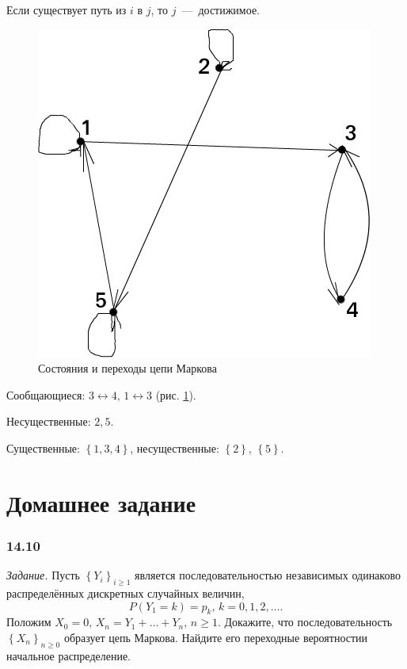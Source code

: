 Если существует путь из $i$ в $j$, то $j$~---~достижимое.

\begin{figure}[h!]
  \centering
  \includegraphics[width=.4\textwidth]{./pictures/14_6.png}
  \caption{Состояния и переходы цепи Маркова}
  \label{fig:146}
\end{figure}

Сообщающиеся: $3 \leftrightarrow 4, \, 1 \leftrightarrow 3$ (рис. \ref{fig:146}).

Несущественные: $2, 5$.

Существенные: $ \left\{ 1, 3, 4 \right\} $, несущественные:
$ \left\{ 2 \right\}, \, \left\{ 5 \right\} $.

\section*{Домашнее задание}

\subsubsection*{14.10}

\textit{Задание.}
Пусть $ \left\{ Y_i \right\}_{i \geq 1}$
является последовательностью независимых одинаково распределённых дискретных случайных величин,
\begin{equation*}
  P \left( Y_1 = k \right) = p_k, \,
  k = 0, 1, 2, \dotsc.
\end{equation*}
Положим $X_0 = 0, \, X_n = Y_1 + \dotsc + Y_n, \, n \geq 1$.
Докажите, что последовательность $ \left\{ X_n \right\}_{n \geq 0}$ образует цепь Маркова.
Найдите его переходные вероятностии начальное распределение.

